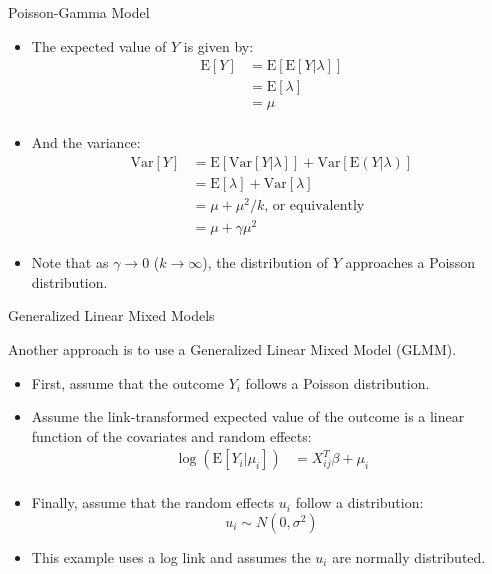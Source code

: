\documentclass[ignorenonframetext,]{beamer}
\providecommand{\tightlist}{%
  \setlength{\itemsep}{0pt}\setlength{\parskip}{0pt}}
\begin{document}
\begin{frame}{Poisson-Gamma Model}
\protect\hypertarget{poisson-gamma-model-2}{}

\begin{itemize}
\tightlist
\item
  The expected value of \(Y\) is given by: \[
  \begin{aligned}
  \mathrm{E}[Y] &= \mathrm{E}[\mathrm{E}[Y|\lambda]] \\
              &= \mathrm{E}[\lambda] \\
              &= \mu \\
  \end{aligned}
  \]
\item
  And the variance: \[
  \begin{aligned}
  \mathrm{Var}[Y] &= \mathrm{E}[\mathrm{Var}[Y|\lambda]] + \mathrm{Var}[\mathrm{E}(Y|\lambda)] \\
                &= \mathrm{E}[\lambda] + \mathrm{Var}[\lambda] \\
                &= \mu + \mu^2/k\text{, or equivalently} \\
                &= \mu + \gamma \mu^2
  \end{aligned}
  \]
\item
  Note that as \(\gamma \rightarrow 0\) (\(k \rightarrow \infty\)), the
  distribution of \(Y\) approaches a Poisson distribution.
\end{itemize}

\end{frame}

\begin{frame}{Generalized Linear Mixed Models}
\protect\hypertarget{generalized-linear-mixed-models}{}

Another approach is to use a Generalized Linear Mixed Model (GLMM).

\begin{itemize}
\item
  First, assume that the outcome \(Y_i\) follows a Poisson distribution.
\item
  Assume the link-transformed expected value of the outcome is a linear
  function of the covariates and random effects: \[
  \begin{aligned}
  \log(\mathrm{E}[Y_i|\mu_i]) &= X_{ij}^T\beta + \mu_i \\
  \end{aligned}
  \]
\item
  Finally, assume that the random effects \(u_i\) follow a distribution:
  \[
  u_i \sim N(0,\sigma^2)
  \]
\item
  This example uses a log link and assumes the \(u_i\) are normally
  distributed.
\end{itemize}

\end{frame}
\end{document}
